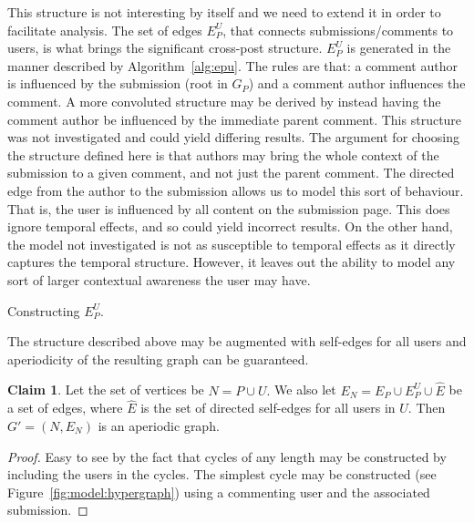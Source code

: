 \documentclass[letterpaper, 10 pt, conference]{ieeeconf}
\theoremstyle{definition}
\newtheorem{claim}{Claim}[section]
\begin{document}
This structure is not interesting by itself and we need to extend it in order to facilitate analysis. The set of edges \(E_P^U\), that connects submissions/comments to users, is what brings the significant cross-post structure. \(E_P^U\) is generated in the manner described by Algorithm~\ref{alg:epu}. The rules are that: a comment author is influenced by the submission (root in \(G_P\)) and a comment author influences the comment. A more convoluted structure may be derived by instead having the comment author be influenced by the immediate parent comment. This structure was not investigated and could yield differing results. The argument for choosing the structure defined here is that authors may bring the whole context of the submission to a given comment, and not just the parent comment. The directed edge from the author to the submission allows us to model this sort of behaviour. That is, the user is influenced by all content on the submission page. This does ignore temporal effects, and so could yield incorrect results. On the other hand, the model not investigated is not as susceptible to temporal effects as it directly captures the temporal structure. However, it leaves out the ability to model any sort of larger contextual awareness the user may have.
\begin{algorithm}
  \caption{Constructing \(E_P^U.\)}
  \label{alg:epu}
\end{algorithm}
The structure described above may be augmented with self-edges for all users and aperiodicity of the resulting graph can be guaranteed.
\begin{claim}
  Let the set of vertices be \(N = P \cup U.\) We also let \(E_N = E_P \cup E_P^U \cup \hat{E}\) be a set of edges, where \(\hat{E}\) is the set of directed self-edges for all users in \(U.\) Then \(G' = (N, E_N)\) is an aperiodic graph.
  \label{claim:g1:aperiodic}
\end{claim}
\begin{proof}
  Easy to see by the fact that cycles of any length may be constructed by including the users in the cycles. The simplest cycle may be constructed (see Figure~\ref{fig:model:hypergraph}) using a commenting user and the associated submission.
\end{proof}
\end{document}

